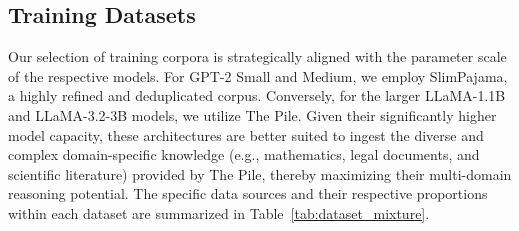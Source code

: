 \subsection{Training Datasets}
Our selection of training corpora is strategically aligned with the parameter scale of the respective models. For GPT-2 Small and Medium, we employ SlimPajama, a highly refined and deduplicated corpus. Conversely, for the larger LLaMA-1.1B and LLaMA-3.2-3B models, we utilize The Pile. Given their significantly higher model capacity, these architectures are better suited to ingest the diverse and complex domain-specific knowledge (e.g., mathematics, legal documents, and scientific literature) provided by The Pile, thereby maximizing their multi-domain reasoning potential.  The specific data sources and their respective proportions within each dataset are summarized in Table~\ref{tab:dataset_mixture}.
\begin{table}[t]
\centering
\caption{Detailed composition of our training datasets. Proportions are calculated based on byte size. Items marked with $\dagger$ indicate datasets with potential copyright restrictions.}
\label{tab:dataset_mixture}
\end{table}

